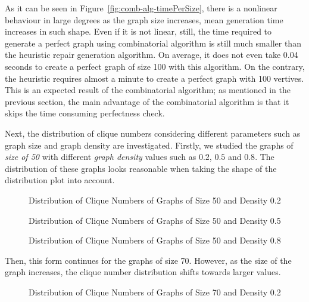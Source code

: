 As it can be seen in Figure~\ref{fig:comb-alg-timePerSize}, there is a nonlinear behaviour in large degrees as the graph size increases, mean generation time increases in such shape. Even if it is not linear, still, the time required to generate a perfect graph using combinatorial algorithm is still much smaller than the heuristic repair generation algorithm. On average, it does not even take 0.04 seconds to create a perfect graph of size 100 with this algorithm. On the contrary, the heuristic requires almost a minute to create a perfect graph with 100 vertives. This is an expected result of the combinatorial algorithm; as mentioned in the previous section, the main advantage of the combinatorial algorithm is that it skips the time consuming perfectness check.

Next, the distribution of clique numbers considering different parameters such as graph size and graph density are investigated.  Firstly, we studied the graphs of \textit{size of 50} with different \textit{graph density} values such as ${0.2}$, ${0.5}$ and ${0.8}$. The distribution of these graphs looks reasonable when taking the shape of the distribution plot into account. 

\begin{figure}[H]
    \centering
    
    \caption{Distribution of Clique Numbers of Graphs of Size 50 and Density 0.2}
    \label{fig:comb-alg-clique-50-2}
\end{figure}

\begin{figure}[H]
    \centering
    
    \caption{Distribution of Clique Numbers of Graphs of Size 50 and Density 0.5}
    \label{fig:comb-alg-clique-50-5}
\end{figure}

\begin{figure}[H]
    \centering
    
    \caption{Distribution of Clique Numbers of Graphs of Size 50 and Density 0.8}
    \label{fig:comb-alg-clique-50-8}
\end{figure}

Then, this form continues for the graphs of size 70. However, as the size of the graph increases, the clique number distribution shifts towards larger values. 

\begin{figure}[H]
    \centering
    
    \caption{Distribution of Clique Numbers of Graphs of Size 70 and Density 0.2}
    \label{fig:comb-alg-clique-70-2}
\end{figure}


